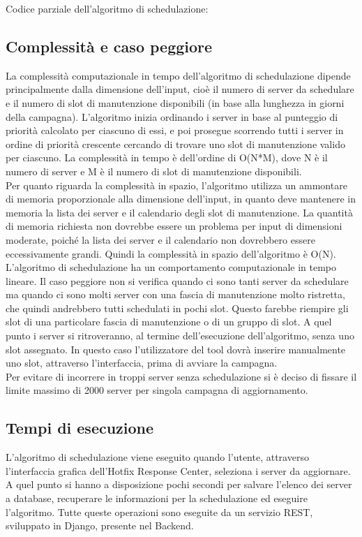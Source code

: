 Codice parziale dell'algoritmo di schedulazione:



\subsection{Complessità e caso peggiore}
La complessità computazionale in tempo dell'algoritmo di schedulazione dipende 
principalmente dalla dimensione dell'input, cioè il numero di server da 
schedulare e il numero di slot di manutenzione disponibili (in base alla 
lunghezza in giorni della campagna).
L'algoritmo inizia ordinando i server in base al punteggio di priorità 
calcolato per ciascuno di essi, e poi prosegue scorrendo tutti i server in 
ordine di priorità crescente cercando di trovare uno slot di manutenzione 
valido per ciascuno. La complessità in tempo è dell'ordine di O(N*M), 
dove N è il numero di server e M è il numero di slot di manutenzione 
disponibili.\\

Per quanto riguarda la complessità in spazio, l'algoritmo utilizza un 
ammontare di memoria proporzionale alla dimensione dell'input, in quanto deve 
mantenere in memoria la lista dei server e il calendario degli slot di 
manutenzione. La quantità di memoria richiesta non dovrebbe essere un 
problema per input di dimensioni moderate, poiché la lista dei server e 
il calendario non dovrebbero essere eccessivamente grandi. Quindi la 
complessità in spazio dell'algoritmo è O(N).\\

L’algoritmo di schedulazione ha un comportamento computazionale in 
tempo lineare. Il caso peggiore non si verifica quando ci sono tanti 
server da schedulare ma quando ci sono molti server con una fascia di 
manutenzione molto ristretta, che quindi andrebbero tutti schedulati in 
pochi slot. Questo farebbe riempire gli slot di una particolare fascia di 
manutenzione o di un gruppo di slot. A quel punto i server si ritroveranno, 
al termine dell’esecuzione dell’algoritmo, senza uno slot assegnato. 
In questo caso l’utilizzatore del tool dovrà inserire manualmente uno slot, 
attraverso l’interfaccia, prima di avviare la campagna.\\

Per evitare di incorrere in troppi server senza schedulazione si è deciso di 
fissare il limite massimo di 2000 server per singola campagna di aggiornamento.


\subsection{Tempi di esecuzione}
L’algoritmo di schedulazione viene eseguito quando l’utente, attraverso 
l’interfaccia grafica dell’Hotfix Response Center, seleziona i server da 
aggiornare. A quel punto si hanno a disposizione pochi secondi per salvare 
l’elenco dei server a database, recuperare le informazioni per la schedulazione 
ed eseguire l’algoritmo.
Tutte queste operazioni sono eseguite da un servizio REST, sviluppato in Django, 
presente nel Backend.

